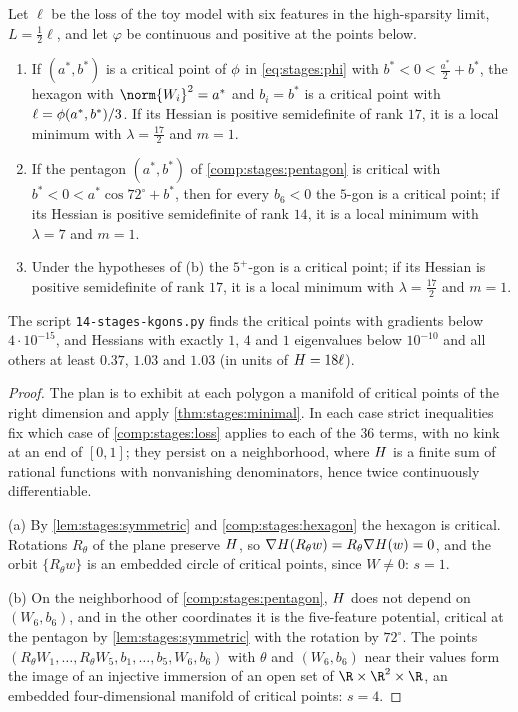 \begin{refsection}
\begin{proposition}\label{prop:stages:polygons}
Let $\ell$ be the loss of the toy model with six features in the high-sparsity limit, $L=\frac12\ell$, and let $\varphi$ be continuous and positive at the points below.
\begin{enumerate}[label=(\alph*)]
\item If $(a^*,b^*)$ is a critical point of $\phi$ in \eqref{eq:stages:phi} with $b^*<0<\frac{a^*}2+b^*$, the hexagon with $\norm{W_i}^2=a^*$ and $b_i=b^*$ is a critical point with $\ell=\phi(a^*,b^*)/3$. If its Hessian is positive semidefinite of rank $17$, it is a local minimum with $\lambda=\frac{17}2$ and $m=1$.
\item If the pentagon $(a^*,b^*)$ of \cref{comp:stages:pentagon} is critical with $b^*<0<a^*\cos72^\circ+b^*$, then for every $b_6<0$ the $5$-gon is a critical point; if its Hessian is positive semidefinite of rank $14$, it is a local minimum with $\lambda=7$ and $m=1$.
\item Under the hypotheses of (b) the $5^+$-gon is a critical point; if its Hessian is positive semidefinite of rank $17$, it is a local minimum with $\lambda=\frac{17}2$ and $m=1$.
\end{enumerate}
The script \texttt{14-stages-kgons.py} finds the critical points with gradients below $4\cdot10^{-15}$, and Hessians with exactly $1$, $4$ and $1$ eigenvalues below $10^{-10}$ and all others at least $0.37$, $1.03$ and $1.03$ (in units of $H=18\ell$).
\end{proposition}

\begin{proof}
The plan is to exhibit at each polygon a manifold of critical points of the right dimension and apply \cref{thm:stages:minimal}. In each case strict inequalities fix which case of \cref{comp:stages:loss} applies to each of the $36$ terms, with no kink at an end of $[0,1]$; they persist on a neighborhood, where $H$ is a finite sum of rational functions with nonvanishing denominators, hence twice continuously differentiable.

(a) By \cref{lem:stages:symmetric} and \cref{comp:stages:hexagon} the hexagon is critical. Rotations $R_\theta$ of the plane preserve $H$, so $\nabla H(R_\theta w)=R_\theta\nabla H(w)=0$, and the orbit $\{R_\theta w\}$ is an embedded circle of critical points, since $W\ne0$: $s=1$.

(b) On the neighborhood of \cref{comp:stages:pentagon}, $H$ does not depend on $(W_6,b_6)$, and in the other coordinates it is the five-feature potential, critical at the pentagon by \cref{lem:stages:symmetric} with the rotation by $72^\circ$. The points $(R_\theta W_1,\dots,R_\theta W_5,b_1,\dots,b_5,W_6,b_6)$ with $\theta$ and $(W_6,b_6)$ near their values form the image of an injective immersion of an open set of $\R\times\R^2\times\R$, an embedded four-dimensional manifold of critical points: $s=4$.


\end{proof}
\end{refsection}
